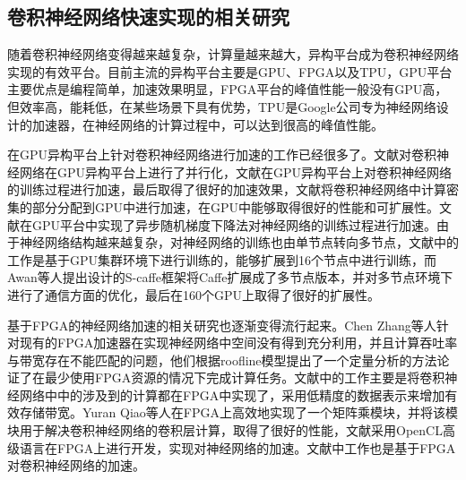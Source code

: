 \subsection{卷积神经网络快速实现的相关研究}

随着卷积神经网络变得越来越复杂，计算量越来越大，异构平台成为卷积神经网络实现的有效平台。目前主流的异构平台主要是GPU、FPGA以及TPU，GPU平台主要优点是编程简单，加速效果明显，FPGA平台的峰值性能一般没有GPU高，但效率高，能耗低，在某些场景下具有优势，TPU是Google公司专为神经网络设计的加速器，在神经网络的计算过程中，可以达到很高的峰值性能。

在GPU异构平台上针对卷积神经网络进行加速的工作已经很多了。文献对卷积神经网络在GPU异构平台上进行了并行化，文献在GPU异构平台上对卷积神经网络的训练过程进行加速，最后取得了很好的加速效果，文献将卷积神经网络中计算密集的部分分配到GPU中进行加速，在GPU中能够取得很好的性能和可扩展性。文献在GPU平台中实现了异步随机梯度下降法对神经网络的训练过程进行加速。由于神经网络结构越来越复杂，对神经网络的训练也由单节点转向多节点，文献中的工作是基于GPU集群环境下进行训练的，能够扩展到16个节点中进行训练，而Awan等人提出设计的S-caffe框架将Caffe扩展成了多节点版本，并对多节点环境下进行了通信方面的优化，最后在160个GPU上取得了很好的扩展性。

基于FPGA的神经网络加速的相关研究也逐渐变得流行起来。Chen Zhang等人针对现有的FPGA加速器在实现神经网络中空间没有得到充分利用，并且计算吞吐率与带宽存在不能匹配的问题，他们根据roofline模型提出了一个定量分析的方法论证了在最少使用FPGA资源的情况下完成计算任务。文献中的工作主要是将卷积神经网络中中的涉及到的计算都在FPGA中实现了，采用低精度的数据表示来增加有效存储带宽。Yuran Qiao等人在FPGA上高效地实现了一个矩阵乘模块，并将该模块用于解决卷积神经网络的卷积层计算，取得了很好的性能，文献采用OpenCL高级语言在FPGA上进行开发，实现对神经网络的加速。文献中工作也是基于FPGA对卷积神经网络的加速。

